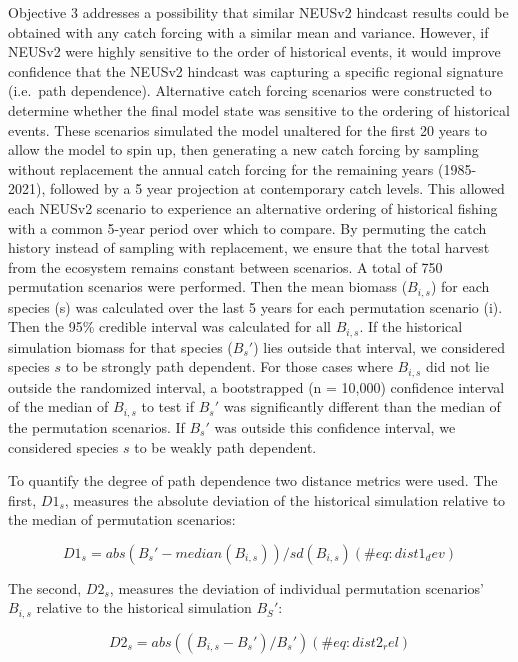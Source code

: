 \documentclass[
]{article}
\begin{document}
Objective 3 addresses a possibility that similar NEUSv2 hindcast results could be obtained with any catch forcing with a similar mean and variance. However, if NEUSv2 were highly sensitive to the order of historical events, it would improve confidence that the NEUSv2 hindcast was capturing a specific regional signature (i.e.~path dependence). Alternative catch forcing scenarios were constructed to determine whether the final model state was sensitive to the ordering of historical events. These scenarios simulated the model unaltered for the first 20 years to allow the model to spin up, then generating a new catch forcing by sampling without replacement the annual catch forcing for the remaining years (1985-2021), followed by a 5 year projection at contemporary catch levels. This allowed each NEUSv2 scenario to experience an alternative ordering of historical fishing with a common 5-year period over which to compare. By permuting the catch history instead of sampling with replacement, we ensure that the total harvest from the ecosystem remains constant between scenarios. A total of 750 permutation scenarios were performed. Then the mean biomass (\(B_{i,s}\)) for each species (s) was calculated over the last 5 years for each permutation scenario (i). Then the 95\% credible interval was calculated for all \(B_{i,s}\). If the historical simulation biomass for that species (\(B_{s}'\)) lies outside that interval, we considered species \(s\) to be strongly path dependent. For those cases where \(B_{i,s}\) did not lie outside the randomized interval, a bootstrapped (n = 10,000) confidence interval of the median of \(B_{i,s}\) to test if \(B_{s}'\) was significantly different than the median of the permutation scenarios. If \(B_{s}'\) was outside this confidence interval, we considered species \(s\) to be weakly path dependent.

To quantify the degree of path dependence two distance metrics were used. The first, \(D1_s\), measures the absolute deviation of the historical simulation relative to the median of permutation scenarios:

\begin{equation}
  D1_s = abs(B_{s}' - median(B_{i,s}))/sd(B_{i,s})
  (\#eq:dist1_dev)
\end{equation}

The second, \(D2_s\), measures the deviation of individual permutation scenarios' \(B_{i,s}\) relative to the historical simulation \(B_{S}'\):

\begin{equation}
  D2_s = abs((B_{i,s} - B_{s}')/B_{s}')
  (\#eq:dist2_rel)
\end{equation}
\end{document}
